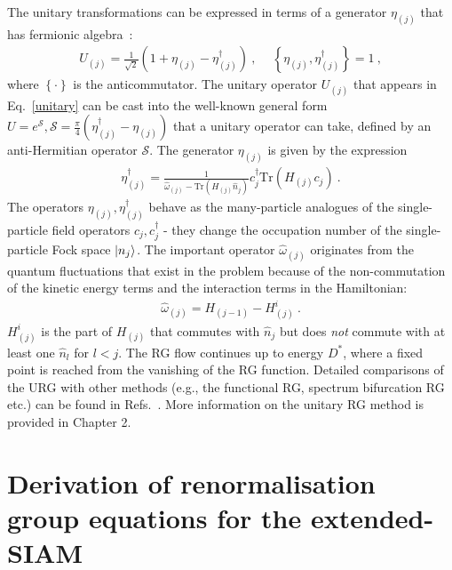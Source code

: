 The unitary transformations can be expressed in terms of a generator \(\eta_{(j)}\) that has fermionic algebra~\cite{anirbanurg1,anirbanurg2}:
\begin{eqnarray}
	\label{unitary}
	U_{(j)} = \frac{1}{\sqrt 2}\left(1 + \eta_{(j)} - \eta_{(j)}^\dagger\right)~,~ \quad\left\{ \eta_{(j)},\eta_{(j)}^\dagger \right\} = 1~,
\end{eqnarray}
where \(\left\{\cdot\right\}\) is the anticommutator.
The unitary operator \(U_{(j)}\) that appears in Eq.~\eqref{unitary} can be cast into the well-known general form 
\(U = e^{\mathcal{S}}, \mathcal{S} = \frac{\pi}{4}\left( \eta^\dagger_{(j)} - \eta_{(j)} \right)\) 
that a unitary operator can take, defined by an anti-Hermitian operator \(\mathcal{S}\).
The generator \(\eta_{(j)}\) is given by the expression~\cite{anirbanurg1,anirbanurg2}
\begin{eqnarray}
	\eta^\dagger_{(j)} = \frac{1}{\hat \omega_{(j)} - \text{Tr}\left(H_{(j)} \hat n_{j}\right) } c^\dagger_{j} \text{Tr}\left(H_{(j)}c_{j}\right)~.
\end{eqnarray}
The operators \(\eta_{(j)},\eta^\dagger_{(j)}\) behave as the many-particle analogues of the single-particle field operators \(c_j,c^\dagger_j\) - they change the occupation number of the single-particle Fock space \(\ket{n_j}\).  The important operator \(\hat \omega_{(j)}\) originates from the quantum fluctuations that exist in the problem because of the non-commutation of the kinetic energy terms and the interaction terms in the Hamiltonian:
\begin{eqnarray}
	\hat \omega_{(j)} = H_{(j-1)} - H^i_{(j)}~.
	\label{omega}
\end{eqnarray}
\(H^i_{(j)}\) is the part of \(H_{(j)}\) that commutes with \(\hat n_j\) but does {\it not} commute with at least one \(\hat n_l\) for \(l < j\). The RG flow continues up to energy \(D^*\), where a fixed point is reached from the vanishing of the RG function. 
Detailed comparisons of the URG with other methods (e.g., the functional RG, spectrum bifurcation RG etc.) can be found in Refs.~\cite{anirbanmott1,anirbanurg1}. More information on the unitary RG method is provided in Chapter 2.

\section{Derivation of renormalisation group equations for the extended-SIAM}

